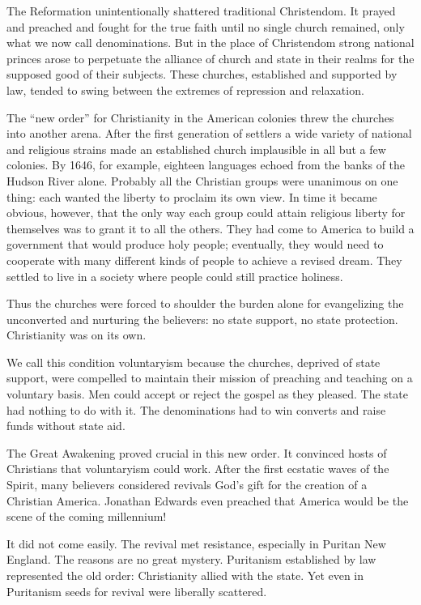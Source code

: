 The Reformation unintentionally shattered traditional Christendom. It prayed and preached and fought
for the true faith until no single church remained, only what we now call denominations. But in the
place of Christendom strong national princes arose to perpetuate the alliance of church and state in
their realms for the supposed good of their subjects. These churches, established and supported by
law, tended to swing between the extremes of repression and relaxation.

The “new order” for Christianity in the American colonies threw the churches into another arena.
After the first generation of settlers a wide variety of national and religious strains made an
established church implausible in all but a few colonies. By 1646, for example, eighteen languages
echoed from the banks of the Hudson River alone. Probably all the Christian groups were unanimous on
one thing: each wanted the liberty to proclaim its own view. In time it became obvious, however,
that the only way each group could attain religious liberty for themselves was to grant it to all
the others. They had come to America to build a government that would produce holy people;
eventually, they would need to cooperate with many different kinds of people to achieve a revised
dream. They settled to live in a society where people could still practice holiness.

Thus the churches were forced to shoulder the burden alone for evangelizing the unconverted and
nurturing the believers: no state support, no state protection. Christianity was on its own.

We call this condition voluntaryism because the churches, deprived of state support, were compelled
to maintain their mission of preaching and teaching on a voluntary basis. Men could accept or reject
the gospel as they pleased. The state had nothing to do with it. The denominations had to win
converts and raise funds without state aid.

The Great Awakening proved crucial in this new order. It convinced hosts of Christians that
voluntaryism could work. After the first ecstatic waves of the Spirit, many believers considered
revivals God’s gift for the creation of a Christian America. Jonathan Edwards even preached that
America would be the scene of the coming millennium!

It did not come easily. The revival met resistance, especially in Puritan New England. The reasons
are no great mystery. Puritanism established by law represented the old order: Christianity allied
with the state. Yet even in Puritanism seeds for revival were liberally scattered.

